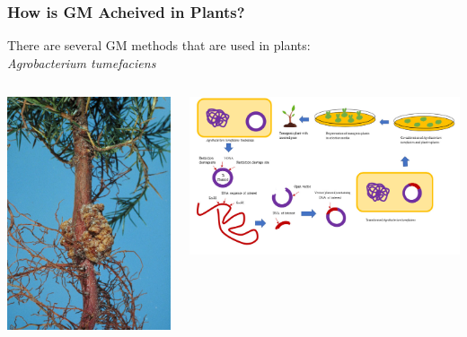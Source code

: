 \documentclass[xcolor=dvipsnames]{beamer}
\begin{document}
\begin{frame}
	\frametitle{How is GM Acheived in Plants?}
	There are several GM methods that are used in plants:\\
	
	\vspace{15pt}
	\hspace{35pt} \large \textit{Agrobacterium tumefaciens}
	\vspace{5pt}
	\centering
	\begin{columns}
		\begin{column}{0.3\textwidth}
					\includegraphics[keepaspectratio, width  = \textwidth]{img/crownGall}		
		\end{column}
		\begin{column}{0.8\textwidth}
			\includegraphics[keepaspectratio, width  = \textwidth]{img/agrobacterium}		

\end{column}
\end{columns}
\end{frame}
\end{document}
